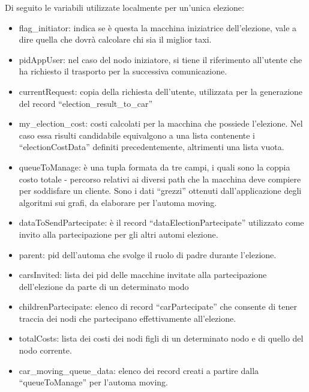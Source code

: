 Di seguito le variabili utilizzate localmente per un'unica elezione:
\begin{itemize}
	\item flag\_initiator: indica se è questa la macchina iniziatrice dell'elezione, vale a dire quella che dovrà calcolare chi sia il miglior taxi.
	\item pidAppUser: nel caso del nodo iniziatore, si tiene il riferimento all'utente che ha richiesto il trasporto per la successiva comunicazione.
	\item currentRequest: copia della richiesta dell'utente, utilizzata per la generazione del record ``election\_result\_to\_car''
	\item my\_election\_cost: costi calcolati per la macchina che possiede l'elezione. Nel caso essa risulti candidabile equivalgono a una lista contenente i ``electionCostData'' definiti precedentemente, altrimenti una lista vuota.
	\item queueToManage: è una tupla formata da tre campi, i quali sono la coppia costo totale - percorso relativi ai diversi path che la macchina deve compiere per soddisfare un cliente. Sono i dati ``grezzi'' ottenuti dall'applicazione degli algoritmi sui grafi, da elaborare per l'automa moving.
	\item dataToSendPartecipate: è il record ``dataElectionPartecipate'' utilizzato come invito alla partecipazione per gli altri automi elezione.
	\item parent: pid dell'automa che svolge il ruolo di padre durante l'elezione. 
	\item carsInvited: lista dei pid delle macchine invitate alla partecipazione dell'elezione da parte di un determinato modo
	\item childrenPartecipate: elenco di record ``carPartecipate'' che consente di tener traccia dei nodi che partecipano effettivamente all'elezione.
	\item totalCosts: lista dei costi dei nodi figli di un determinato nodo e di quello del nodo corrente.
	\item car\_moving\_queue\_data: elenco dei record creati a partire dalla ``queueToManage'' per l'automa moving.
\end{itemize}

